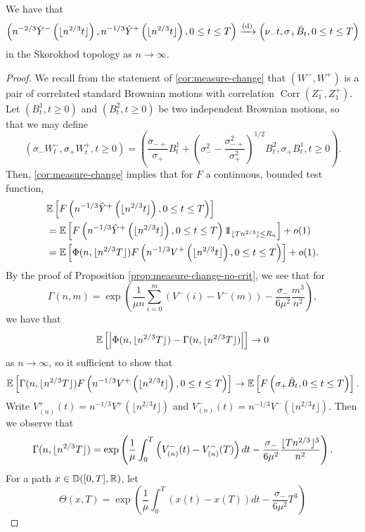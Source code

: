 \begin{proposition}\label{prop:convaftermeasurechange} 
 We have that
$$\left(n^{-2/3}\hat{Y}^-\left(\lfloor n^{2/3} t\rfloor\right), n^{-1/3}\hat{Y}^+\left(\lfloor  n^{2/3} t\rfloor\right), 0\leq t \leq T \right) \xrightarrow[]{\mathrm{(d)}} \left( \nu_- t, \sigma_+\hat{B}_t, 0 \leq t \leq T \right)$$
in the Skorokhod topology as $n\to \infty$.
\end{proposition}
\begin{proof}
 We recall from the statement of \cref{cor:measure-change} that $(W^-,W^+)$ is a pair of correlated standard Brownian motions with correlation $\operatorname{Corr}(Z_1^-,Z_1^+)$. 
Let $(B^1_t,t\geq 0)$ and $(B^2_t,t\geq 0)$ be two independent Brownian motions, so that we may define $$(\sigma_-W^-_t,\sigma_+W^+_t,t\geq 0)=\left(\frac{\sigma_{-+}}{\sigma_+}B_t^1+\left(\sigma_-^2-\frac{\sigma_{-+}^2}{\sigma_+^2}\right)^{1/2} B_t^2, \sigma_+ B_t^1, t\geq 0\right).$$ 
 Then, \cref{cor:measure-change} implies that for $F$ a continuous, bounded test function, 
 \begin{align*}&\E\left[F\left(n^{-1/3}\hat{Y}^+\left(\lfloor n^{2/3}t\rfloor\right), 0\leq t \leq T \right) \right]\\
 &=\E\left[F\left(n^{-1/3}\hat{Y}^+\left(\lfloor n^{2/3}t\rfloor\right), 0\leq t \leq T \right)\one_{\lfloor Tn^{2/3}\rfloor \leq R_n} \right]+o(1)\\
 &= \E\left[\Phi(n,\floor{n^{2/3}T})F\left(n^{-1/3}{V}^+\left(\lfloor n^{2/3}t\rfloor\right), 0\leq t \leq T \right) \right]+o(1).\end{align*}
By the proof of Proposition \ref{prop:measure-change-no-crit}, we see that for $$\Gamma(n,m)=\exp\left(\frac{1}{\mu n} \sum_{i=0}^m(V^-(i)-V^-(m))-\frac{\sigma_-}{6\mu^2}\frac{m^3}{n^2}\right),$$
we have that 
$${\mathbb E}\left[\left|\Phi(n,\lfloor n^{2/3}T\rfloor)-\Gamma(n,\lfloor n^{2/3}T\rfloor)\right|\right]\to  0$$
as $n\to\infty$, so it sufficient to show that 
$${\mathbb E}\left[ \Gamma(n,\lfloor n^{2/3}T\rfloor)F\left(n^{-1/3}V^+\left(\lfloor n^{2/3}t\rfloor\right), 0\leq t \leq T \right)\right] \to {\mathbb E}\left[F\left(\sigma_+\hat{B}_t,0\leq t\leq T\right)\right].$$
Write 
$V^+_{(n)}(t)=n^{-1/3}{V}^+\left(\lfloor n^{2/3}t\rfloor\right)$ and $V^-_{(n)}(t)=n^{-1/3}V^-\left(\lfloor n^{2/3}t\rfloor\right)$. 
Then we observe that 
 $$\Gamma(n,\lfloor n^{2/3}T\rfloor)=\exp\left(\frac{1}{\mu}\int_0^T\left({V}^-_{(n)}(t)-{V}^-_{(n)}(T)\right)dt-\frac{\sigma_-}{6\mu^2}\frac{\lfloor Tn^{2/3}\rfloor^3}{n^2}\right).$$
For a path $x\in {\mathbb D}([0,T],{\mathbb R})$, let 
$$\Theta(x,T)= \exp\left(\frac{1}{\mu}\int_0^T\left(x(t)-x(T)\right)dt-\frac{\sigma_-}{6\mu^2}T^3\right)$$

\end{proof}
